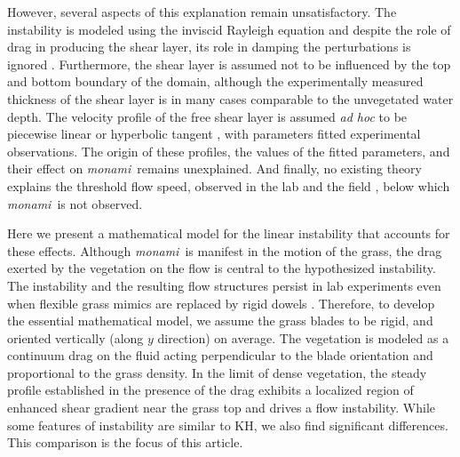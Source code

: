 \documentclass{jfm}
\newcommand{\monami}{\textit{monami}}
\begin{document}
However, several aspects of this explanation remain unsatisfactory. 
The instability is modeled using the inviscid Rayleigh equation and despite the role of drag in producing the shear layer, its role in damping the perturbations is ignored \citep{Raupach96}. 
Furthermore, the shear layer is assumed not to be influenced by the top and bottom boundary of the domain, although the experimentally measured thickness of the shear layer is in many cases comparable to the unvegetated water depth.
The velocity profile of the free shear layer is assumed \textit{ad hoc} to be piecewise linear \citep{Delangre06} or hyperbolic tangent \citep{Ghisal02,Raupach96}, with parameters fitted experimental observations.
The origin of these profiles, the values of the fitted parameters, and their effect on \monami~remains unexplained.  
And finally, no existing theory explains the threshold flow speed, observed in the lab \citep{Ghisal02} and the field \citep{Grizzle96}, below which \monami ~is not observed.

Here we present a mathematical model for the linear instability that accounts for these effects.
Although \monami ~is manifest in the motion of the grass, the drag exerted by the vegetation on the flow is central to the hypothesized instability. 
The instability and the resulting flow structures persist in lab experiments even when flexible grass mimics are replaced by rigid dowels \citep{Ghisal02,Nepf06}. 
Therefore, to develop the essential mathematical model, we assume the grass blades to be rigid, and oriented vertically (along $y$ direction) on average.
The vegetation is modeled as a continuum drag on the fluid acting perpendicular to the blade orientation and proportional to the grass density.
In the limit of dense vegetation, the steady profile established in the presence of the drag exhibits a localized region of enhanced shear gradient near the grass top and drives a flow instability.
While some features of instability are similar to KH, we also find significant differences.
This comparison is the focus of this article.
\end{document}
